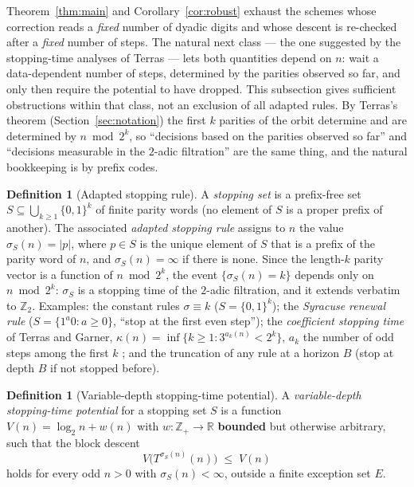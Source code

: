 \documentclass[11pt]{amsart}
\theoremstyle{definition}
\newtheorem{definition}[theorem]{Definition}
\theoremstyle{remark}
\newcommand{\Z}{\mathbb{Z}}
\newcommand{\R}{\mathbb{R}}
\newcommand{\Ztwo}{\Z_2}
\begin{document}
Theorem~\ref{thm:main} and Corollary~\ref{cor:robust} exhaust the schemes whose correction reads a \emph{fixed} number of dyadic digits and whose descent is re-checked after a \emph{fixed} number of steps. The natural next class --- the one suggested by the stopping-time analyses of Terras \cite{terras1976} --- lets both quantities depend on $n$: wait a data-dependent number of steps, determined by the parities observed so far, and only then require the potential to have dropped. This subsection gives sufficient obstructions within that class, not an exclusion of all adapted rules. By Terras's theorem (Section~\ref{sec:notation}) the first $k$ parities of the orbit determine and are determined by $n \bmod 2^k$, so ``decisions based on the parities observed so far'' and ``decisions measurable in the $2$-adic filtration'' are the same thing, and the natural bookkeeping is by prefix codes.

\begin{definition}[Adapted stopping rule]\label{def:adapted}
A \emph{stopping set} is a prefix-free set $S \subseteq \bigcup_{k\ge1}\{0,1\}^k$ of finite parity words (no element of $S$ is a proper prefix of another). The associated \emph{adapted stopping rule} assigns to $n$ the value $\sigma_S(n) = |p|$, where $p \in S$ is the unique element of $S$ that is a prefix of the parity word of $n$, and $\sigma_S(n) = \infty$ if there is none. Since the length-$k$ parity vector is a function of $n \bmod 2^k$, the event $\{\sigma_S(n) = k\}$ depends only on $n \bmod 2^k$: $\sigma_S$ is a stopping time of the $2$-adic filtration, and it extends verbatim to $\Ztwo$. Examples: the constant rules $\sigma \equiv k$ ($S = \{0,1\}^k$); the \emph{Syracuse renewal rule} ($S = \{1^a 0 : a \ge 0\}$, ``stop at the first even step''); the \emph{coefficient stopping time} of Terras and Garner, $\kappa(n) = \inf\{k \ge 1 : 3^{a_k(n)} < 2^k\}$, $a_k$ the number of odd steps among the first $k$ \cite{terras1976,garner1981,lagarias1985}; and the truncation of any rule at a horizon $B$ (stop at depth $B$ if not stopped before).
\end{definition}

\begin{definition}[Variable-depth stopping-time potential]\label{def:vpot}
A \emph{variable-depth stopping-time potential} for a stopping set $S$ is a function $V(n) = \log_2 n + w(n)$ with $w : \Z_+ \to \R$ \textbf{bounded} but otherwise arbitrary, such that the block descent
\begin{equation}\label{eq:blockdescent}
V\bigl(T^{\sigma_S(n)}(n)\bigr) \;\le\; V(n)
\end{equation}
holds for every odd $n > 0$ with $\sigma_S(n) < \infty$, outside a finite exception set $E$.
\end{definition}
\end{document}
